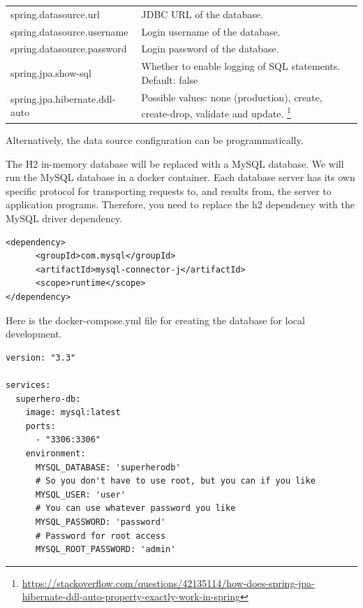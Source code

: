 \begin{tabular}{|l|p{8cm}|}
\hline
spring.datasource.url & JDBC URL of the database.\\
spring.datasource.username & Login username of the database.\\
spring.datasource.password & Login password of the database.\\
spring.jpa.show-sql & Whether to enable logging of SQL statements. Default: false\\
spring.jpa.hibernate.ddl-auto & Possible values: none (production), create, create-drop, validate and update. \footnote{\url{https://stackoverflow.com/questions/42135114/how-does-spring-jpa-hibernate-ddl-auto-property-exactly-work-in-spring}}\\
\hline
\end{tabular}

Alternatively, the data source configuration can be programmatically.

The H2 in-memory database will be replaced with a MySQL database.
We will run the MySQL database in a docker container. Each database server has its own specific protocol for transporting requests to, and results from, the server to application programs. Therefore, you need to replace the h2 dependency with the MySQL driver dependency.

\begin{lstlisting}
<dependency>
      <groupId>com.mysql</groupId>
      <artifactId>mysql-connector-j</artifactId>
      <scope>runtime</scope>
</dependency>
\end{lstlisting}

Here is the docker-compose.yml file for creating the database for local development.

\begin{lstlisting}
version: "3.3"

services:
  superhero-db:
    image: mysql:latest
    ports:
      - "3306:3306"
    environment:
      MYSQL_DATABASE: 'superherodb'
      # So you don't have to use root, but you can if you like
      MYSQL_USER: 'user'
      # You can use whatever password you like
      MYSQL_PASSWORD: 'password'
      # Password for root access
      MYSQL_ROOT_PASSWORD: 'admin'
\end{lstlisting}

